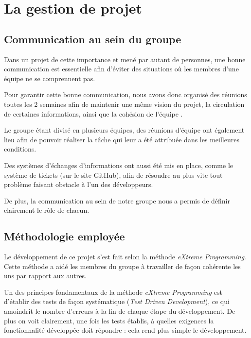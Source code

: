 \section{La gestion de projet}

  \subsection{Communication au sein du groupe}

    Dans un projet de cette importance et mené par autant de personnes, une
    bonne communication est essentielle afin d'éviter des situations où les
    membres d'une équipe ne se comprennent pas.

    Pour garantir cette bonne communication, nous avons donc organisé des
    réunions toutes les 2 semaines afin de maintenir une même vision du projet,
    la circulation de certaines informations, ainsi que la cohésion de l'équipe
    .

    Le groupe étant divisé en plusieurs équipes, des réunions d'équipe ont
    également lieu afin de pouvoir réaliser la tâche qui leur a été attribuée
    dans les meilleures conditions.

    Des systèmes d'échanges d'informations ont aussi été mis en place, comme le
    système de tickets (sur le site GitHub), afin de résoudre au plus vite tout
    problème faisant obstacle à l'un des développeurs.

    De plus, la communication au sein de notre groupe nous a permis de définir
    clairement le rôle de chacun.


  \subsection{Méthodologie employée}

    Le développement de ce projet s'est fait selon la méthode \emph{eXtreme
    Programming}. Cette méthode a aidé les membres du groupe à travailler de
    façon cohérente les uns par rapport aux autres.

    Un des principes fondamentaux de la méthode \emph{eXtreme Programming} est
    d'établir des tests de façon systématique (\emph{Test Driven Development}),
    ce qui amoindrit le nombre d'erreurs à la fin de chaque étape du
    développement. De plus on voit clairement, une fois les tests établis, à
    quelles exigences la fonctionnalité développée doit répondre : cela rend
    plus simple le développement.

